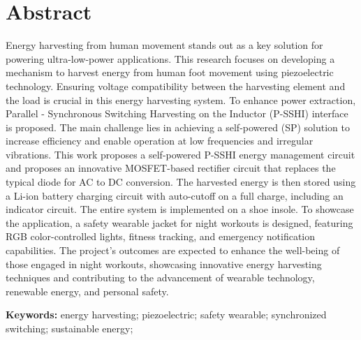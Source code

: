 \documentclass[11pt]{report}	%
\begin{document}



\chapter*{Abstract} %

Energy harvesting from human movement stands out as a key solution for powering ultra-low-power applications. This research focuses on developing a mechanism to harvest energy from human foot movement using piezoelectric technology. Ensuring voltage compatibility between the harvesting element and the load is crucial in this energy harvesting system. To enhance power extraction, Parallel - Synchronous Switching Harvesting on the Inductor (P-SSHI) interface is proposed. The main challenge lies in achieving a self-powered (SP) solution to increase efficiency and enable operation at low frequencies and irregular vibrations. This work proposes a self-powered P-SSHI energy management circuit and proposes an innovative MOSFET-based rectifier circuit that replaces the typical diode for AC to DC conversion. The harvested energy is then stored using a Li-ion battery charging circuit with auto-cutoff on a full charge, including an indicator circuit. The entire system is implemented on a shoe insole. To showcase the application, a safety wearable jacket for night workouts is designed, featuring RGB color-controlled lights, fitness tracking, and emergency notification capabilities. The project's outcomes are expected to enhance the well-being of those engaged in night workouts, showcasing innovative energy harvesting techniques and contributing to the advancement of wearable technology, renewable energy, and personal safety.	%


\textbf{Keywords:} energy harvesting; piezoelectric; safety wearable; synchronized switching; sustainable energy;
\end{document}
